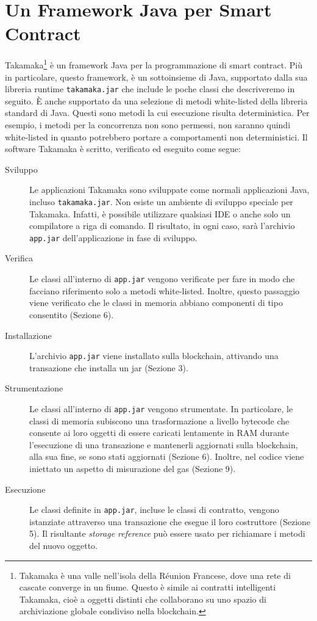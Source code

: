 \section{Un Framework Java per Smart Contract}
Takamaka\footnote{Takamaka è una valle nell'isola della Réunion Francese, dove una rete di cascate converge in un fiume. Questo è simile ai contratti intelligenti Takamaka, cioè a oggetti distinti che collaborano su uno spazio di archiviazione globale condiviso nella blockchain.} è un framework Java per la programmazione di smart contract. Più in particolare, questo framework, è un sottoinsieme di Java, supportato dalla sua libreria runtime \lstinline|takamaka.jar| che include le poche classi che descriveremo in seguito. È anche supportato da una selezione di metodi white-listed della libreria standard di Java. Questi sono metodi la cui esecuzione risulta deterministica. Per esempio, i metodi per la concorrenza non sono permessi, non saranno quindi white-listed in quanto potrebbero portare a comportamenti non deterministici. Il software Takamaka è scritto, verificato ed eseguito come segue:
\begin{description}
	\item[Sviluppo] 
		Le applicazioni Takamaka sono sviluppate come normali applicazioni Java, incluso \lstinline|takamaka.jar|. Non esiste un ambiente di sviluppo speciale per Takamaka. Infatti, è possibile utilizzare qualsiasi IDE o anche solo un compilatore a riga di comando. Il risultato, in ogni caso, sarà l'archivio \lstinline|app.jar| dell'applicazione in fase di sviluppo.
	\item[Verifica] 
		Le classi all'interno di \lstinline|app.jar| vengono verificate per fare in modo che facciano riferimento solo a metodi white-listed. Inoltre, questo passaggio viene verificato che le classi in memoria abbiano componenti di tipo consentito (Sezione 6).
	\item[Installazione]
		L'archivio \lstinline|app.jar| viene installato sulla blockchain, attivando una transazione che installa un jar (Sezione 3).
	\item[Strumentazione]
		Le classi all'interno di \lstinline|app.jar| vengono strumentate. In particolare, le classi di memoria subiscono una trasformazione a livello bytecode che consente ai loro oggetti di essere caricati lentamente in RAM durante l'esecuzione di una transazione e mantenerli aggiornati sulla blockchain, alla sua fine, se sono stati aggiornati (Sezione 6). Inoltre, nel codice viene iniettato un aspetto di misurazione del gas (Sezione 9).
	\item[Esecuzione] 
		Le classi definite in \lstinline|app.jar|, incluse le classi di contratto, vengono istanziate attraverso una transazione che esegue il loro costruttore (Sezione 5). Il risultante \textit{storage reference} può essere usato per richiamare i metodi del nuovo oggetto.
\end{description}
